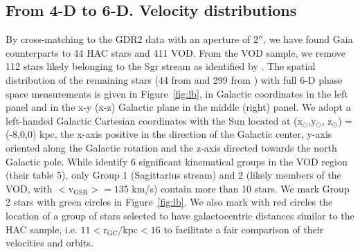 \documentclass[fleqn,usenatbib]{mnras}
\begin{document}
\subsection{From 4-D to 6-D. Velocity distributions}
%
By cross-matching to the GDR2 data with an aperture of 2$''$, we have
found Gaia counterparts to 44 HAC stars and 411 VOD. From the VOD
sample, we remove 112 stars likely belonging to the Sgr stream as
identified by \citep[][, their Group 1]{Vivas2016}. The spatial
distribution of the remaining stars (44 from \citealt{Simion2018} and
299 from \citealt{Vivas2016}) with full 6-D phase space measurements
is given in Figure~\ref{fig:lb}, in Galactic coordinates in the left
panel and in the x-y (x-z) Galactic plane in the middle (right)
panel. We adopt a left-handed Galactic Cartesian coordinates with the
Sun located at (x$_{\odot}$,y$_{\odot}$, z$_{\odot}$) = (-8,0,0) kpc,
the x-axis positive in the direction of the Galactic center, y-axis
oriented along the Galactic rotation and the z-axis directed towards
the north Galactic pole. While \citealt{Vivas2016} identify 6
significant kinematical groups in the VOD region (their table 5), only
Group 1 (Sagittarius stream) and 2 (likely members of the VOD, with
$\mathrm{<v_{GSR}>}= 135$ km/s) contain more than 10 stars. We mark
Group 2 stars with green circles in Figure~\ref{fig:lb}. We also mark with
red circles the location of a group of stars selected to have
galactocentric distances similar to the HAC sample, i.e.
$11\mathrm{<r_{GC}}/$kpc$<16$ to facilitate a fair comparison of their
velocities and orbits.
%
\end{document}
